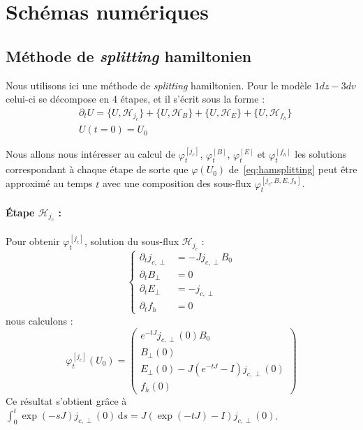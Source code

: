 
\section{Schémas numériques}
\label{sec:3:scheme}

\subsection{Méthode de \emph{splitting} hamiltonien}

Nous utilisons ici une méthode de \emph{splitting} hamiltonien. Pour le modèle $1dz-3dv$ celui-ci se décompose en 4 étapes, et il s'écrit sous la forme :
\begin{equation}
  \begin{aligned}
    & \partial_t U = \{ U,\mathcal{H}_{j_c}\} + \{ U,\mathcal{H}_B\} + \{ U,\mathcal{H}_E\} + \{ U,\mathcal{H}_{f_h}\} \\
    & U(t=0) = U_0
  \end{aligned}
  \label{eq:hamsplitting}
\end{equation}

Nous allons nous intéresser au calcul de $\varphi_t^{[j_c]}$, $\varphi_t^{[B]}$, $\varphi_t^{[E]}$ et $\varphi_t^{[f_h]}$ les solutions correspondant à chaque étape de sorte que $\varphi(U_0)$ de~\eqref{eq:hamsplitting} peut être approximé au temps $t$ avec une composition des sous-flux $\varphi_t^{[j_c,B,E,f_h]}$.

\paragraph{Étape $\mathcal{H}_{j_c}$ :}
Pour obtenir $\varphi_t^{[j_c]}$, solution du sous-flux $\mathcal{H}_{j_c}$ :
$$
  \begin{cases}
    \partial_t j_{c,\perp} &= -Jj_{c,\perp}B_0 \\
    \partial_t B_\perp     &= 0 \\
    \partial_t E_\perp     &= -j_{c,\perp} \\
    \partial_t f_h         &= 0
  \end{cases}
$$
nous calculons :
$$
  \varphi_t^{[j_c]}(U_0) = \begin{pmatrix}
    e^{-tJ}j_{c,\perp}(0)B_0 \\
    B_\perp(0) \\
    E_\perp(0) - J\left(e^{-tJ}-I\right)j_{c,\perp}(0) \\
    f_h(0)
  \end{pmatrix}
$$
Ce résultat s'obtient grâce à $\int_0^t \exp(-sJ)j_{c,\perp}(0)\,\mathrm{d}s = J\left(\exp(-tJ)-I\right)j_{c,\perp}(0)$.

